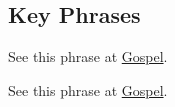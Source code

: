		
	
		
		
\subsection{Key Phrases} %
	\label{FULNESS-PHRASES}

	\begin{compactdesc}
		\item[fulness of the gospel] See this phrase at \hyperref[GOSPEL-PHRASES]{Gospel}.
		\item[fulness of my gospel] See this phrase at \hyperref[GOSPEL-PHRASES]{Gospel}.
	\end{compactdesc}
	


